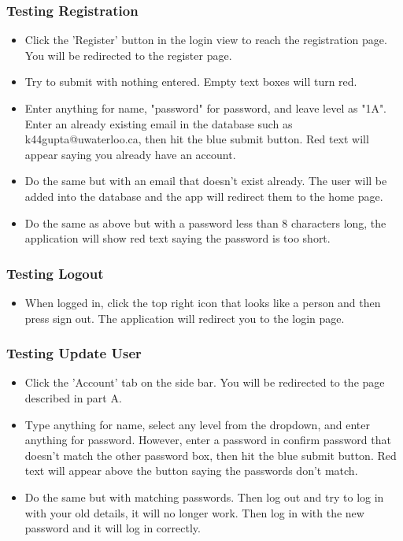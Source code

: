 \documentclass[12pt, a4paper]{article}
\begin{document}
\subsubsection*{Testing Registration}
\begin{itemize}
    \item Click the 'Register' button in the login view to reach the registration page. You will be redirected to the register page.
    \item Try to submit with nothing entered. Empty text boxes will turn red.
    \item Enter anything for name, "password" for password, and leave level as "1A". Enter an already existing email in the database such as k44gupta@uwaterloo.ca, then hit the blue submit button. Red text will appear saying you already have an account.
    \item Do the same but with an email that doesn't exist already. The user will be added into the database and the app will redirect them to the home page.
    \item Do the same as above but with a password less than 8 characters long, the application will show red text saying the password is too short.
\end{itemize}
\subsubsection*{Testing Logout}
\begin{itemize}
    \item When logged in, click the top right icon that looks like a person and then press sign out. The application will redirect you to the login page.
\end{itemize}
\subsubsection*{Testing Update User}
\begin{itemize}
    \item Click the 'Account' tab on the side bar. You will be redirected to the page described in part A.
    \item Type anything for name, select any level from the dropdown, and enter anything for password. However, enter a password in confirm password that doesn't match the other password box, then hit the blue submit button. Red text will appear above the button saying the passwords don't match.
    \item Do the same but with matching passwords. Then log out and try to log in with your old details, it will no longer work. Then log in with the new password and it will log in correctly.
\end{itemize}
\end{document}
